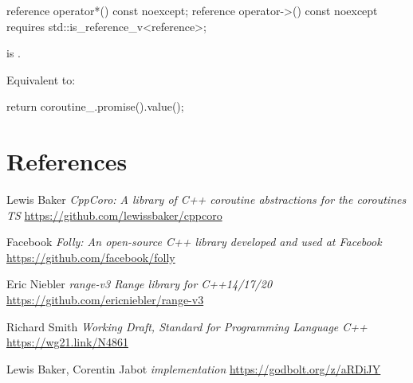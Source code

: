\documentclass{wg21}
\begin{document}
\begin{addedblock}
\begin{itemdecl}
reference operator*() const noexcept;
reference operator->() const noexcept requires std::is_reference_v<reference>;
\end{itemdecl}

\begin{itemdescr}
    \precondition {} is .
    
    \effects
    Equivalent to:
    \begin{codeblock}
        return coroutine_.promise().value();
    \end{codeblock}
\end{itemdescr}



\end{addedblock}
    

\section{References}
\renewcommand{\section}[2]{}%



\begin{thebibliography}{9}
    Lewis Baker
    \emph{CppCoro: A library of C++ coroutine abstractions for the coroutines TS}\newline
    \url{https://github.com/lewissbaker/cppcoro}
    
    Facebook
    \emph{Folly: An open-source C++ library developed and used at Facebook}\newline
    \url{https://github.com/facebook/folly}
    
    
    Eric Niebler
    \emph{range-v3 Range library for C++14/17/20}\newline
    \url{https://github.com/ericniebler/range-v3}

    
    Richard Smith
    \emph{Working Draft, Standard for Programming Language C++}\newline
    \url{https://wg21.link/N4861}
    
    
    Lewis Baker, Corentin Jabot
    \emph{ implementation}\newline
    \url{https://godbolt.org/z/aRDiJY}
    
\end{thebibliography}
\end{document}
